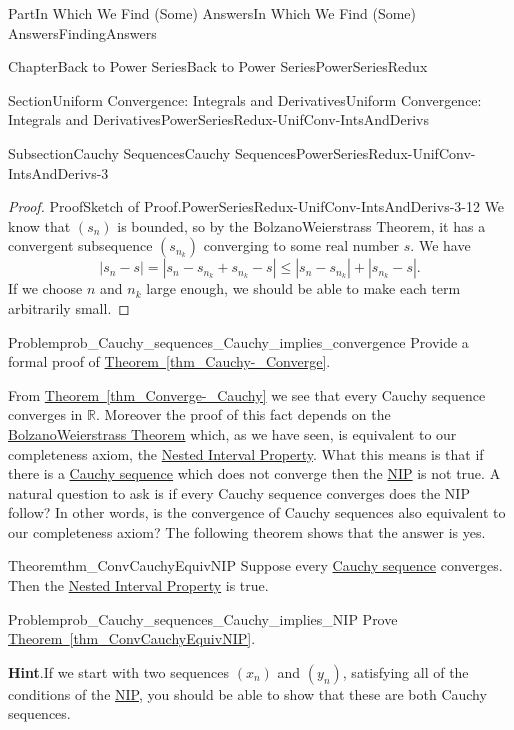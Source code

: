 \documentclass[oneside,10pt,]{book}
\newcommand{\blocktitlefont}{\relax}
\newcommand{\xreffont}{\relax}
\numberwithin{equation}{part}
\newcommand{\abs}[1]{\left|#1\right|}
\newcommand{\RR}{\mathbb {R}}
\begin{document}
\begin{partptx}{Part}{In Which We Find (Some) Answers}{}{In Which We Find (Some) Answers}{}{}{FindingAnswers}
\begin{chapterptx}{Chapter}{Back to Power Series}{}{Back to Power Series}{}{}{PowerSeriesRedux}
\begin{sectionptx}{Section}{Uniform Convergence: Integrals and Derivatives}{}{Uniform Convergence: Integrals and Derivatives}{}{}{PowerSeriesRedux-UnifConv-IntsAndDerivs}
\begin{subsectionptx}{Subsection}{Cauchy Sequences}{}{Cauchy Sequences}{}{}{PowerSeriesRedux-UnifConv-IntsAndDerivs-3}
\begin{proof}{Proof}{Sketch of Proof.}{PowerSeriesRedux-UnifConv-IntsAndDerivs-3-12}
We know that \(\left(s_n\right)\) \(\)is bounded, so by the Bolzano\textendash{}Weierstrass Theorem, it has a convergent subsequence \(\left(s_{n_k}\right)\) converging to some real number \(s\).  We have%
\begin{equation*}
\abs{s_n-s}=\abs{s_n-s_{n_k}+s_{n_k}-s}\leq
\abs{s_n-s_{n_k}}+\abs{s_{n_k}-s}\text{.}
\end{equation*}
If we choose \(n\) and \(n_k\) large enough, we should be able to make each term arbitrarily small.%
\end{proof}
\begin{problem}{Problem}{}{prob_Cauchy_sequences_Cauchy_implies_convergence}%
Provide a formal proof of \hyperref[thm_Cauchy-_Converge]{Theorem~{\xreffont\ref{thm_Cauchy-_Converge}}}.%
\end{problem}
From \hyperref[thm_Converge-_Cauchy]{Theorem~{\xreffont\ref{thm_Converge-_Cauchy}}} we see that every Cauchy sequence converges in \(\RR\).  Moreover the proof of this fact depends on the \hyperref[BolzanoWeierstrass]{Bolzano\textendash{}Weierstrass Theorem} which, as we have seen, is equivalent to our completeness axiom, the \hyperref[NIP]{Nested Interval Property}. What this means is that if there is a \hyperref[def_CauchySequence]{Cauchy sequence} which does not converge then the \hyperref[NIP]{NIP} is not true.  A natural question to ask is if every Cauchy sequence converges does the NIP follow? In other words, is the convergence of Cauchy sequences also equivalent to our completeness axiom?  The following theorem shows that the answer is yes.%
\begin{theorem}{Theorem}{}{}{thm_ConvCauchyEquivNIP}%
%
Suppose every \hyperref[def_CauchySequence]{Cauchy sequence} converges.  Then the \hyperref[NIP]{Nested Interval Property} is true.%
\end{theorem}
\begin{problem}{Problem}{}{prob_Cauchy_sequences_Cauchy_implies_NIP}%
Prove \hyperref[thm_ConvCauchyEquivNIP]{Theorem~{\xreffont\ref{thm_ConvCauchyEquivNIP}}}.%
\par\smallskip%
\noindent\textbf{\blocktitlefont Hint}.\hypertarget{prob_Cauchy_sequences_Cauchy_implies_NIP-3}{}\quad{}If we start with two sequences \(\left(x_n\right)\) and \(\left(y_n\right)\), satisfying all of the conditions of the \hyperref[NIP]{NIP}, you should be able to show that these are both Cauchy sequences.%
\end{problem}

\end{subsectionptx}
\end{sectionptx}
\end{chapterptx}
\end{partptx}
\end{document}
